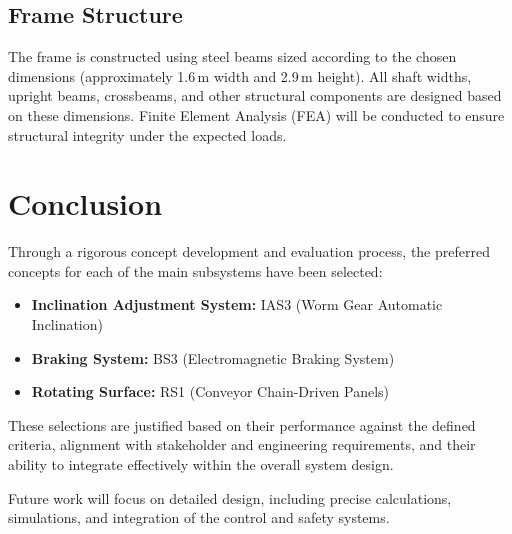 \subsection{Frame Structure}

The frame is constructed using steel beams sized according to the chosen dimensions (approximately 1.6\,m width and 2.9\,m height). All shaft widths, upright beams, crossbeams, and other structural components are designed based on these dimensions. Finite Element Analysis (FEA) will be conducted to ensure structural integrity under the expected loads.

\section{Conclusion}

Through a rigorous concept development and evaluation process, the preferred concepts for each of the main subsystems have been selected:

\begin{itemize}
    \item \textbf{Inclination Adjustment System:} IAS3 (Worm Gear Automatic Inclination)
    \item \textbf{Braking System:} BS3 (Electromagnetic Braking System)
    \item \textbf{Rotating Surface:} RS1 (Conveyor Chain-Driven Panels)
\end{itemize}

These selections are justified based on their performance against the defined criteria, alignment with stakeholder and engineering requirements, and their ability to integrate effectively within the overall system design.

Future work will focus on detailed design, including precise calculations, simulations, and integration of the control and safety systems.

